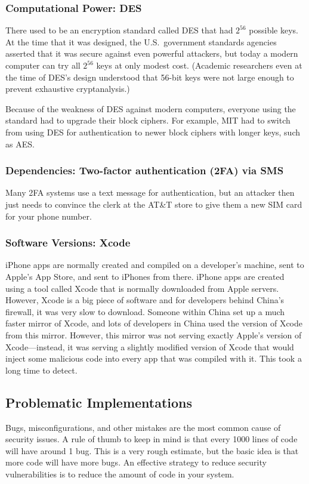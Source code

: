 \subsubsection{Computational Power: DES}
There used to be an encryption standard called DES that had $2^{56}$ possible keys.
At the time that it was designed, the U.S.~government standards agencies asserted that it was
secure against even powerful attackers,
but today a modern computer can try all $2^{56}$ keys at only modest cost.
(Academic researchers even at the time of DES's
design understood that 56-bit keys were not large
enough to prevent exhaustive
cryptanalysis.\cite{DH77})

Because of the weakness of DES against modern computers,
everyone using the standard had to upgrade their block ciphers.
For example, MIT had to switch from using DES for authentication 
to newer block ciphers with longer keys, such as AES.

\subsubsection{Dependencies: Two-factor authentication (2FA) via SMS}
Many 2FA systems use a text message for authentication, but an attacker then
just needs to convince the clerk at the AT\&T store to give them a new SIM card for your phone number.

\subsubsection{Software Versions: Xcode}
iPhone apps are normally created and compiled on a developer's machine, sent to Apple's App Store, and sent to iPhones from there. iPhone apps are created using a tool called Xcode that is normally downloaded from Apple servers. However, Xcode is a big piece of software and for developers behind China's firewall, it was very slow to download. Someone within China set up a much faster mirror of Xcode, and lots of developers in China used the version of Xcode from this mirror. However, this mirror was not serving exactly Apple's version of Xcode---instead, it was serving a slightly modified version of Xcode that would inject some malicious code into every app that was compiled with it. This took a long time to detect. 

\subsection{Problematic Implementations}
Bugs, misconfigurations, and other mistakes are the most common cause of security issues. A rule of thumb to keep in mind is that every 1000 lines of code will have around 1 bug. This is a very rough estimate, but the basic idea is that more code will have more bugs. An effective strategy to reduce security vulnerabilities is to reduce the amount of code in your system.

